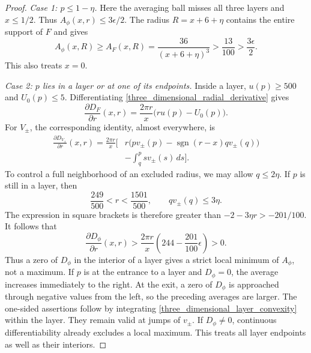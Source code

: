 \documentclass[12pt]{amsart}
\numberwithin{equation}{section}
\begin{document}
\begin{proof}
\medskip
\noindent\textit{Case 1: $p\leq1-\eta$.}
Here the averaging ball misses all three layers and $x\leq1/2$.
Thus $A_\phi(x,r)\leq3\epsilon/2$. The radius
$R=x+6+\eta$ contains the entire support of $F$ and gives
\[
A_\phi(x,R)\geq A_F(x,R)
       =\frac{36}{(x+6+\eta)^3}>\frac{13}{100}>\frac{3\epsilon}{2}.
\]
This also treats $x=0$.

\medskip
\noindent\textit{Case 2: $p$ lies in a layer or at one of its endpoints.}
Inside a layer, $u(p)\geq500$ and $U_0(p)\leq5$.
Differentiating \eqref{three_dimensional_radial_derivative} gives
\[
\frac{\partial D_F}{\partial r}(x,r)
       =\frac{2\pi r}{x}\bigl(r u(p)-U_0(p)\bigr).
\]
For $V_\pm$, the corresponding identity, almost everywhere, is
\begin{align*}
\frac{\partial D_{V_\pm}}{\partial r}(x,r)
 =\frac{2\pi r}{x}\Bigg[&
 r\bigl(pv_\pm(p)-\operatorname{sgn}(r-x)qv_\pm(q)\bigr)\\
 &-\int_q^p s v_\pm(s)\,ds\Bigg].
\end{align*}
To control a full neighborhood of an excluded radius, we may allow
$q\leq2\eta$. If $p$ is still in a layer, then
\[
\frac{249}{500}<r<\frac{1501}{500},\qquad
qv_\pm(q)\leq3\eta.
\]
The expression in square brackets is therefore greater than
$-2-3\eta r>-201/100$. It follows that
\begin{equation}
\label{three_dimensional_layer_convexity}
\frac{\partial D_\phi}{\partial r}(x,r)
 >\frac{2\pi r}{x}\left(244-\frac{201}{100}\epsilon\right)>0.
\end{equation}
Thus a zero of $D_\phi$ in the interior of a layer gives a strict
local minimum of $A_\phi$, not a maximum. If $p$ is at the entrance
to a layer and $D_\phi=0$, the average increases immediately to the
right. At the exit, a zero of $D_\phi$ is approached through negative
values from the left, so the preceding averages are larger.
The one-sided assertions follow by integrating
\eqref{three_dimensional_layer_convexity} within the layer.
They remain valid at jumps of $v_\pm$. If $D_\phi\ne0$, continuous
differentiability already excludes a local maximum. This treats
all layer endpoints as well as their interiors.


\end{proof}
\end{document}
